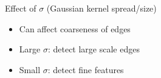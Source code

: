 Effect of $\sigma$ (Gaussian kernel spread/size)
\begin{itemize}
    \item Can affect coarseness of edges
    \item Large $\sigma$: detect large scale edges
    \item Small $\sigma$: detect fine features
\end{itemize}